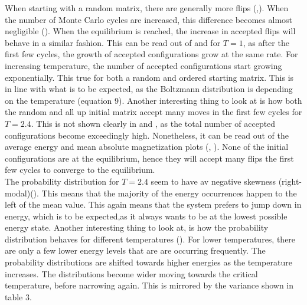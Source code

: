 \documentclass[10pt,a4paper]{article}
\begin{document}
\noindent When starting with a random matrix, there are generally more flips (,). When the number of Monte Carlo cycles are increased, this difference becomes almost negligible (). When the equilibrium is reached, the increase in accepted flips will behave in a similar fashion. This can be read out of  and  for $T=1$, as after the first few cycles, the growth of accepted configurations grow at the same rate. For increasing temperature, the number of accepted configurations start growing exponentially. This true for both a random and ordered starting matrix. This is in line with what is to be expected, as the Boltzmann distribution is depending on the temperature (equation 9). Another interesting thing to look at is how both the random and all up initial matrix accept many moves in the first few cycles for $T=2.4$. This is not shown clearly in  and , as the total number of accepted configurations become exceedingly high. Nonetheless, it can be read out of the average energy and mean absolute magnetization plots (, ). None of the initial configurations are at the equilibrium, hence they will accept many flips the first few cycles to converge to the equilibrium.  \\


\noindent The probability distribution for $T=2.4$ seem to have av negative skewness (right-modal)(). This means that the majority of the energy occurrences happen to the left of the mean value. This again means that the system prefers to jump down in energy, which is to be expected,as it always wants to be at the lowest possible energy state. Another interesting thing to look at, is how the probability distribution behaves for different temperatures (). For lower temperatures, there are only a few lower energy levels that are are occurring frequently. The probability distributions are shifted towards higher energies as the temperature increases. The distributions become wider moving towards the critical temperature, before narrowing again. This is mirrored by the variance shown in table 3. \\
\end{document}
